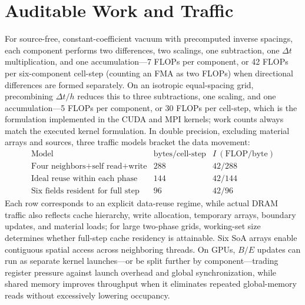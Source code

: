 \section{Auditable Work and Traffic}
For source-free, constant-coefficient vacuum with precomputed inverse spacings, each component performs two differences, two scalings, one subtraction, one $\Delta t$ multiplication, and one accumulation—7 FLOPs per component, or 42 FLOPs per six-component cell-step (counting an FMA as two FLOPs) when directional differences are formed separately.
On an isotropic equal-spacing grid, precombining $\Delta t/h$ reduces this to three subtractions, one scaling, and one accumulation—5 FLOPs per component, or 30 FLOPs per cell-step, which is the formulation implemented in the CUDA and MPI kernels; work counts always match the executed kernel formulation.
In double precision, excluding material arrays and sources, three traffic models bracket the data movement:
\[
\begin{array}{l|r|r}
\text{Model}&\text{bytes/cell-step}&I\ (\text{FLOP/byte})\\\hline
\text{Four neighbors+self read+write}&288&42/288\\
\text{Ideal reuse within each phase}&144&42/144\\
\text{Six fields resident for full step}&96&42/96
\end{array}
\]
Each row corresponds to an explicit data-reuse regime, while actual DRAM traffic also reflects cache hierarchy, write allocation, temporary arrays, boundary updates, and material loads; for large two-phase grids, working-set size determines whether full-step cache residency is attainable.
Six SoA arrays enable contiguous spatial access across neighboring threads. On GPUs, $B/E$ updates can run as separate kernel launches—or be split further by component—trading register pressure against launch overhead and global synchronization, while shared memory improves throughput when it eliminates repeated global-memory reads without excessively lowering occupancy.
